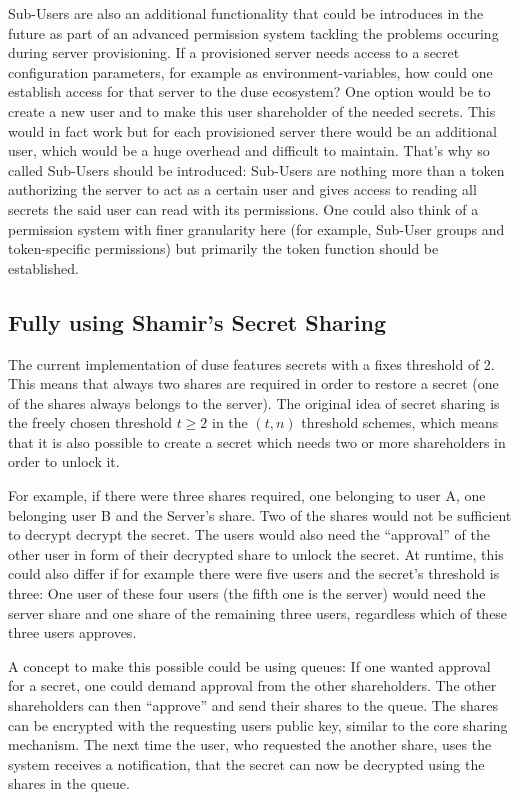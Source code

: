 Sub-Users are also an additional functionality that could be introduces in the
future as part of an advanced permission system tackling the problems occuring
during server provisioning. If a provisioned server needs access to a secret
configuration parameters, for example as environment-variables, how could one
establish access for that server to the duse ecosystem? One option would be to
create a new user and to make this user shareholder of the needed secrets. This
would in fact work but for each provisioned server there would be an additional
user, which would be a huge overhead and difficult to maintain. That's why so
called Sub-Users should be introduced: Sub-Users are nothing more than a token
authorizing the server to act as a certain user and gives access to reading all
secrets the said user can read with its permissions. One could also think of a
permission system with finer granularity here (for example, Sub-User groups and
token-specific permissions) but primarily the token function should be
established.

\subsection{Fully using Shamir's Secret Sharing}

The current implementation of duse features secrets with a fixes threshold of
2. This means that always two shares are required in order to restore a secret
(one of the shares always belongs to the server). The original idea of secret
sharing is the freely chosen threshold $t \geq 2$ in the $(t, n)$ threshold
schemes, which means that it is also possible to create a secret which needs
two or more shareholders in order to unlock it.

For example, if there were three shares required, one belonging to user A, one
belonging user B and the Server's share. Two of the shares would not be
sufficient to decrypt decrypt the secret. The users would also need the
``approval'' of the other user in form of their decrypted share to unlock the
secret. At runtime, this could also differ if for example there were five users
and the secret's threshold is three: One user of these four users (the fifth
one is the server) would need the server share and one share of the remaining
three users, regardless which of these three users approves.

A concept to make this possible could be using queues: If one wanted approval
for a secret, one could demand approval from the other shareholders. The other
shareholders can then ``approve'' and send their shares to the queue. The
shares can be encrypted with the requesting users public key, similar to the
core sharing mechanism. The next time the user, who requested the another
share, uses the system receives a notification, that the secret can now be
decrypted using the shares in the queue.

